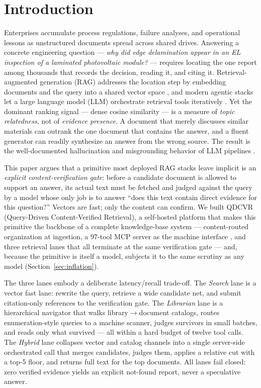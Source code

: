 \section{Introduction}
\label{sec:intro}

Enterprises accumulate process regulations, failure analyses, and operational
lessons as unstructured documents spread across shared drives. Answering a
concrete engineering question --- \emph{why did edge delamination appear in an
EL inspection of a laminated photovoltaic module?} --- requires locating the
one report among thousands that records the decision, reading it, and citing
it. Retrieval-augmented generation (RAG) addresses the location step by
embedding documents and the query into a shared vector space
\cite{rag-lewis,dpr}, and modern agentic stacks let a large language model
(LLM) orchestrate retrieval tools iteratively \cite{mcp,singh-agentic-rag}.
Yet the dominant ranking signal --- dense cosine similarity --- is a measure
of \emph{topic relatedness}, not of \emph{evidence presence}. A document that
merely discusses similar materials can outrank the one document that contains
the answer, and a fluent generator can readily synthesize an answer from the
wrong source. The result is the well-documented hallucination and
misgrounding behavior of LLM pipelines \cite{siren}.

This paper argues that a primitive most deployed RAG stacks leave implicit
is an \emph{explicit content-verification gate}: before a candidate document
is allowed to support an answer, its actual text must be fetched and judged
against the query by a model whose only job is to answer ``does this text
contain direct evidence for this question?'' Vectors are fast; only the
content can confirm. We built QDCVR (Query-Driven Content-Verified Retrieval), a
self-hosted platform that makes this primitive the backbone of a complete
knowledge-base system --- content-routed organization at ingestion, a
97-tool MCP server as the machine interface \cite{mcp}, and three retrieval
lanes that all terminate at the same verification gate --- and, because the
primitive is itself a model, subjects it to the same scrutiny as any model
(Section~\ref{sec:inflation}).

The three lanes embody a deliberate latency/recall trade-off. The
\emph{Search} lane is a vector fast lane: rewrite the query, retrieve a wide
candidate net, and submit citation-only references to the verification gate. The
\emph{Librarian} lane is a hierarchical navigator that walks
library$\to$document catalogs, routes enumeration-style queries to a machine
scanner, judges survivors in small batches, and reads only what survived ---
all within a hard budget of twelve tool calls. The \emph{Hybrid} lane
collapses vector and catalog channels into a single server-side orchestrated
call that merges candidates, judges them, applies a relative cut with a
top-5 floor, and returns full text for the top documents. All lanes fail
closed: zero verified evidence yields an explicit not-found report, never a
speculative answer.

